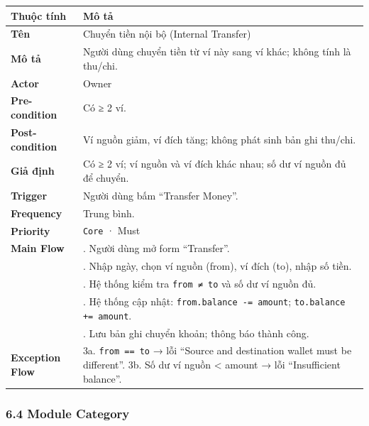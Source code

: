\documentclass[11pt,a4paper]{article}
\newcounter{none}
\newcommand{\faintline}{\noalign{\global\arrayrulecolor{faintgray}}\hline\noalign{\global\arrayrulecolor{black}}} %
\begin{document}
{\def\LTcaptype{none}
\begin{longtable}[]{@{}
  >{\raggedright\arraybackslash}p{}
  >{\raggedright\arraybackslash}p{}@{}}
\toprule\noalign{}
\begin{minipage}[b]{\linewidth}\raggedright
Thuộc tính
\end{minipage} & \begin{minipage}[b]{\linewidth}\raggedright
Mô tả
\end{minipage} \\
\midrule\noalign{}
\endhead
\bottomrule\noalign{}
\endlastfoot
\textbf{Tên} & Chuyển tiền nội bộ (Internal Transfer) \\ \faintline
\textbf{Mô tả} & Người dùng chuyển tiền từ ví này sang ví khác; không tính là thu/chi. \\ \faintline
\textbf{Actor} & Owner \\ \faintline
\textbf{Pre-condition} & Có ≥ 2 ví. \\ \faintline
\textbf{Post-condition} & Ví nguồn giảm, ví đích tăng; không phát sinh bản ghi thu/chi. \\ \faintline
\textbf{Giả định} & Có ≥ 2 ví; ví nguồn và ví đích khác nhau; số dư ví nguồn đủ để chuyển. \\ \faintline
\textbf{Trigger} & Người dùng bấm ``Transfer Money''. \\ \faintline
\textbf{Frequency} & Trung bình. \\ \faintline
\textbf{Priority} & \texttt{Core} · Must \\ \faintline
\textbf{Main Flow} & 1. Người dùng mở form ``Transfer''.\\ 
&2. Nhập ngày, chọn ví nguồn (from), ví đích (to), nhập số tiền.\\ 
&3. Hệ thống kiểm tra \texttt{from ≠ to} và số dư ví nguồn đủ.\\
&4. Hệ thống cập nhật: \texttt{from.balance -= amount}; \texttt{to.balance += amount}.\\
&5. Lưu bản ghi chuyển khoản; thông báo thành công. \\ \faintline
\textbf{Exception Flow} & 3a. \texttt{from == to} → lỗi ``Source and destination wallet must be different''. 3b. Số dư ví nguồn < amount → lỗi ``Insufficient balance''. \\
\end{longtable}
}

\subsubsection{6.4 Module Category}\label{module-category}
\end{document}
